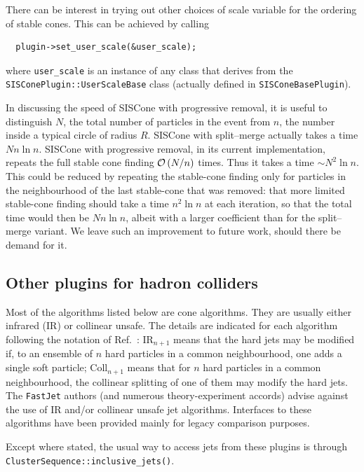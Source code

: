 \documentclass[12pt,a4]{article}
\newcommand{\fastjet}{\texttt{FastJet}\xspace}
\newcommand{\ttt}[1]{{\small\texttt{#1}}}
\newcommand{\order}[1]{{\cal O}\left(#1\right)}
\begin{document}
There can be interest in trying out other choices of scale variable for
the ordering of stable cones.
%
This can be achieved by calling
\begin{lstlisting}
  plugin->set_user_scale(&user_scale);
\end{lstlisting}
where \ttt{user\_scale} is an instance of any class that derives from
the \ttt{SISConePlugin::UserScaleBase} class (actually defined in
\ttt{SISConeBasePlugin}).

In discussing the speed of SISCone with progressive removal, it is
useful to distinguish $N$, the total number of particles in the event
from $n$, the number inside a typical circle of radius $R$.
%
SISCone with split--merge actually takes a time $N n \ln n$.
%
SISCone with progressive removal, in its current implementation,
repeats the full stable cone finding $\order{N/n}$ times.
%
Thus it takes a time $\sim N^2 \ln n$.
%
This could be reduced by repeating the stable-cone finding only for
particles in the neighbourhood of the last stable-cone that was
removed: that more limited stable-cone finding should take a time $n^2
\ln n$ at each iteration, so that the total time would then be $N n
\ln n$, albeit with a larger coefficient than for the split--merge
variant.
% 
We leave such an improvement to future work, should there be demand
for it.

\subsection{Other plugins for hadron colliders }
\label{sec:other-pp-plugins}

Most of the algorithms listed below are cone algorithms. 
%
They are usually either infrared (IR) or collinear unsafe.
%
The details are indicated for each algorithm following the
notation of Ref.~\cite{Salam:2009jx}: IR$_{n+1}$ means 
that the hard jets may be modified if, to an ensemble of $n$ hard
particles in a common neighbourhood, one adds a single soft particle;
Coll$_{n+1}$ means that for $n$ hard particles in a common
neighbourhood, the collinear splitting of one of them may modify the
hard jets.
%
The \fastjet authors (and numerous theory-experiment accords) advise
against the use of IR and/or collinear unsafe jet algorithms.  Interfaces to
these algorithms have been provided mainly for legacy comparison
purposes.

Except where stated, the usual way to access jets from these plugins
is through \ttt{ClusterSequence::inclusive\_jets()}.
\end{document}
